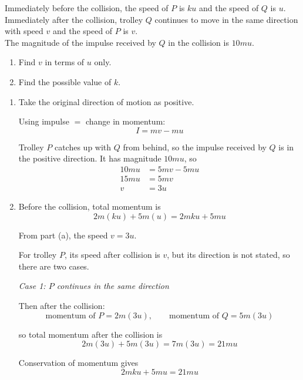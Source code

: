 \documentclass[leqno]{article}
\begin{document}
\begin{enumerate}[
  label=\textbf{\arabic*.},
  leftmargin=*,
  topsep=0pt,
  partopsep=0pt,
  parsep=0pt
]
Immediately before the collision, the speed of $P$ is $ku$ and the speed of $Q$ is $u$. \\
Immediately after the collision, trolley $Q$ continues to move in the same direction with speed $v$ and the speed of $P$ is $v$. \\

The magnitude of the impulse received by $Q$ in the collision is $10mu$. \\
\begin{enumerate}[label=\textbf{(\alph*)}]
  \item Find $v$ in terms of $u$ only.  \\
  \item Find the possible value of $k$.  \\
\end{enumerate}

\vspace*{10pt}

\begin{djsSolution}
\begin{enumerate}[label=\textbf{(\alph*)}]
  \item Take the original direction of motion as positive.

  Using impulse \(=\) change in momentum:
  \[
  I=mv-mu
  \]

  Trolley $P$ catches up with $Q$ from behind, so the impulse received by $Q$ is in the positive direction. It has magnitude $10mu$, so
  \begin{align*}
  10mu&=5mv-5mu \\
  15mu&=5mv \\
  v&=3u
  \end{align*}


  \item Before the collision, total momentum is
  \[
  2m(ku)+5m(u)=2mku+5mu
  \]

  From part (a), the speed $v=3u$.

  For trolley $P$, its speed after collision is $v$, but its direction is not stated, so there are two cases.

  \textit{Case 1: $P$ continues in the same direction}

  Then after the collision:
  \[
  \text{momentum of }P=2m(3u), \qquad \text{momentum of }Q=5m(3u)
  \]

  so total momentum after the collision is
  \[
  2m(3u)+5m(3u)=7m(3u)=21mu
  \]

  Conservation of momentum gives
  \[
  2mku+5mu=21mu
  \]


\end{enumerate}
\end{djsSolution}
\end{enumerate}
\end{document}
